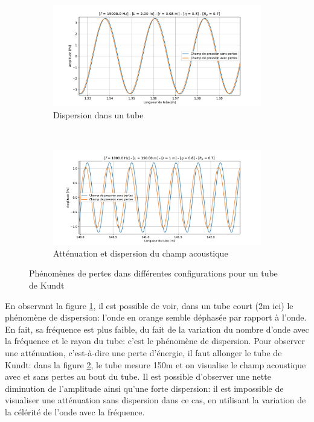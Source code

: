 \documentclass[a4paper, 11pt]{article}
\begin{document}
\begin{figure}[H]
    \centering
    \begin{subfigure}[t]{0.45\linewidth}
    	\centering
		\includegraphics[width=\linewidth]{Figures/dispers.pdf}
		\caption{Dispersion dans un tube}
		\label{fig:dispers} 
    \end{subfigure}
    ~
    \begin{subfigure}[t]{0.45\linewidth}
    	\centering
		\includegraphics[width=\linewidth]{Figures/atten_dispers.pdf}
		\caption{Atténuation et dispersion du champ acoustique}
		\label{fig:atten_dispers}
    \end{subfigure}
    \caption{Phénomènes de pertes dans différentes configurations pour un tube de Kundt}\label{fig:atten_kundt}
\end{figure}

En observant la figure \ref{fig:dispers}, il est possible de voir, dans un tube court (2m ici) le phénomène de dispersion: l'onde en orange semble déphasée par rapport à l'onde. En fait, sa fréquence est plus faible, du fait de la variation du nombre d'onde avec la fréquence et le rayon du tube: c'est le phénomène de dispersion. Pour observer une atténuation, c'est-à-dire une perte d'énergie, il faut allonger le tube de Kundt: dans la figure \ref{fig:atten_dispers}, le tube mesure 150m et on visualise le champ acoustique avec et sans pertes au bout du tube. Il est possible d'observer une nette diminution de l'amplitude ainsi qu'une forte dispersion: il est impossible de visualiser une atténuation sans dispersion dans ce cas, en utilisant la variation de la célérité de l'onde avec la fréquence.
\end{document}
